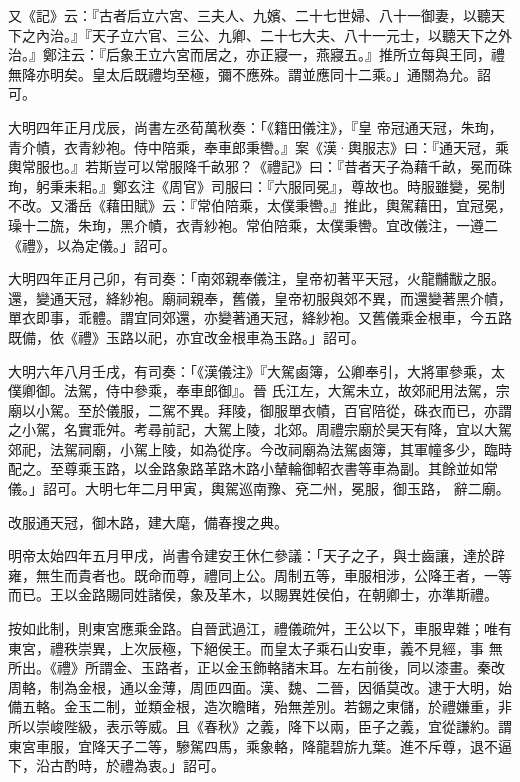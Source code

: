 \begin{pinyinscope}
 又《記》云：『古者后立六宮、三夫人、九嬪、二十七世婦、八十一御妻，以聽天下之內治。』『天子立六官、三公、九卿、二十七大夫、八十一元士，以聽天下之外治。』鄭注云：『后象王立六宮而居之，亦正寢一，燕寢五。』推所立每與王同，禮無降亦明矣。皇太后既禮均至極，彌不應殊。謂並應同十二乘。」通關為允。詔可。



 大明四年正月戊辰，尚書左丞荀萬秋奏：「《籍田儀注》，『皇
 帝冠通天冠，朱珣，青介幘，衣青紗袍。侍中陪乘，奉車郎秉轡。』案《漢·輿服志》曰：『通天冠，乘輿常服也。』若斯豈可以常服降千畝邪？《禮記》曰：『昔者天子為藉千畝，冕而硃珣，躬秉耒耜。』鄭玄注《周官》司服曰：『六服同冕』，尊故也。時服雖變，冕制不改。又潘岳《藉田賦》云：『常伯陪乘，太僕秉轡。』推此，輿駕藉田，宜冠冕，璪十二旒，朱珣，黑介幘，衣青紗袍。常伯陪乘，太僕秉轡。宜改儀注，一遵二《禮》，以為定儀。」詔可。



 大明四年正月己卯，有司奏：「南郊親奉儀注，皇帝初著平天冠，火龍黼黻之服。還，變通天冠，絳紗袍。廟祠親奉，舊儀，皇帝初服與郊不異，而還變著黑介幘，單衣即事，乖體。謂宜同郊還，亦變著通天冠，絳紗袍。又舊儀乘金根車，今五路既備，依《禮》玉路以祀，亦宜改金根車為玉路。」詔可。



 大明六年八月壬戌，有司奏：「《漢儀注》『大駕鹵簿，公卿奉引，大將軍參乘，太僕卿御。法駕，侍中參乘，奉車郎御』。晉
 氏江左，大駕未立，故郊祀用法駕，宗廟以小駕。至於儀服，二駕不異。拜陵，御服單衣幘，百官陪從，硃衣而已，亦謂之小駕，名實乖舛。考尋前記，大駕上陵，北郊。周禮宗廟於昊天有降，宜以大駕郊祀，法駕祠廟，小駕上陵，如為從序。今改祠廟為法駕鹵簿，其軍幢多少，臨時配之。至尊乘玉路，以金路象路革路木路小輦輪御軺衣書等車為副。其餘並如常儀。」詔可。大明七年二月甲寅，輿駕巡南豫、兗二州，冕服，御玉路，
 辭二廟。



 改服通天冠，御木路，建大麾，備春搜之典。



 明帝太始四年五月甲戌，尚書令建安王休仁參議：「天子之子，與士齒讓，達於辟雍，無生而貴者也。既命而尊，禮同上公。周制五等，車服相涉，公降王者，一等而已。王以金路賜同姓諸侯，象及革木，以賜異姓侯伯，在朝卿士，亦準斯禮。



 按如此制，則東宮應乘金路。自晉武過江，禮儀疏舛，王公以下，車服卑雜；唯有東宮，禮秩崇異，上次辰極，下絕侯王。而皇太子乘石山安車，義不見經，事
 無所出。《禮》所謂金、玉路者，正以金玉飾輅諸末耳。左右前後，同以漆畫。秦改周輅，制為金根，通以金薄，周匝四面。漢、魏、二晉，因循莫改。逮于大明，始備五輅。金玉二制，並類金根，造次瞻睹，殆無差別。若錫之東儲，於禮嫌重，非所以崇峻陛級，表示等威。且《春秋》之義，降下以兩，臣子之義，宜從謙約。謂東宮車服，宜降天子二等，驂駕四馬，乘象輅，降龍碧旂九葉。進不斥尊，退不逼下，沿古酌時，於禮為衷。」詔可。




\end{pinyinscope}
